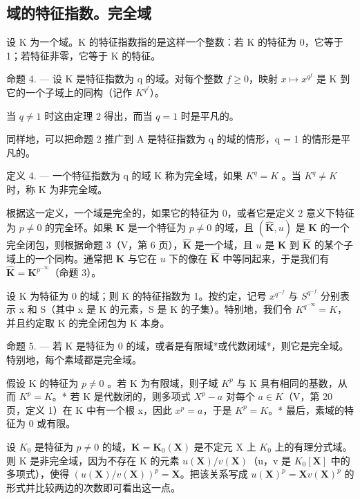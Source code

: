 \subsection{域的特征指数。完全域}

设 K 为一个域。K 的特征指数指的是这样一个整数：若 K 的特征为 0，它等于 1；若特征非零，它等于 K 的特征。

命题 4. --- 设 K 是特征指数为 q 的域。对每个整数 \(f \geqslant 0\)，映射 \(x \mapsto x^{q^{f}}\) 是 K 到它的一个子域上的同构（记作 \(K^{q^{f}}\)）。

当 \(q \neq 1\) 时这由定理 2 得出，而当 \(q = 1\) 时是平凡的。

同样地，可以把命题 2 推广到 A 是特征指数为 q 的域的情形，q = 1 的情形是平凡的。

定义 4. --- 一个特征指数为 q 的域 K 称为完全域，如果 \(K^{q} = K\) 。当 \(K^{q} \neq K\) 时，称 K 为非完全域。

根据这一定义，一个域是完全的，如果它的特征为 0，或者它是定义 2 意义下特征为 \(p \neq 0\) 的完全环。如果 \(\mathbf{K}\) 是一个特征为 \(p \neq 0\) 的域，且 \((\hat{\mathbf{K}}, u)\) 是 \(\mathbf{K}\) 的一个完全闭包，则根据命题 3（V，第 6 页），\(\hat{\mathbf{K}}\) 是一个域，且 \(u\) 是 \(\mathbf{K}\) 到 \(\hat{\mathbf{K}}\) 的某个子域上的一个同构。通常把 \(\mathbf{K}\) 与它在 \(u\) 下的像在 \(\hat{\mathbf{K}}\) 中等同起来，于是我们有 \(\hat{\mathbf{K}} = \mathbf{K}^{p^{-\infty}}\)（命题 3）。

设 K 为特征为 0 的域；则 K 的特征指数为 1。按约定，记号 \(x^{q^{-f}}\) 与 \(S^{q^{-f}}\) 分别表示 x 和 S（其中 x 是 K 的元素，S 是 K 的子集）。特别地，我们令 \(K^{q^{-\infty}} = K\)，并且约定取 K 的完全闭包为 K 本身。

命题 5. --- 若 K 是特征为 0 的域，或者是有限域*或代数闭域*，则它是完全域。特别地，每个素域都是完全域。

假设 K 的特征为 \(p \neq 0\) 。若 K 为有限域，则子域 \(K^{p}\) 与 K 具有相同的基数，从而 \(K^{p} = K\)。* 若 K 是代数闭的，则多项式 \(X^{p} - a\) 对每个 \(a \in K\)（V，第 20 页，定义 1）在 K 中有一个根 x，因此 \(x^{p} = a\)，于是 \(K^{p} = K\)。* 最后，素域的特征为 0 或有限。

设 \(K_{0}\) 是特征为 \(p \neq 0\) 的域，\(\mathbf{K} = \mathbf{K}_{0}(\mathbf{X})\) 是不定元 X 上 \(K_{0}\) 上的有理分式域。则 K 是非完全域，因为不存在 K 的元素 \(u(\mathbf{X})/v(\mathbf{X})\)（u，v 是 \(K_{0}[\mathbf{X}]\) 中的多项式），使得 \((u(\mathbf{X})/v(\mathbf{X}))^{p} = \mathbf{X}\)。把该关系写成 \(u(\mathbf{X})^{p} = \mathbf{X}v(\mathbf{X})^{p}\) 的形式并比较两边的次数即可看出这一点。

